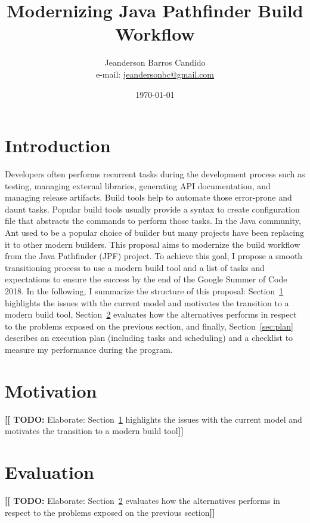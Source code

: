 \documentclass[a4paper]{article}
\author{Jeanderson Barros Candido\\e-mail: \url{jeandersonbc@gmail.com}}
\title{Modernizing Java Pathfinder Build Workflow}
\date{\today}
\newcommand{\todo}[1]{\textbf{[[ TODO: }{\color{blue} #1}\textbf{]]}}
\newcommand{\ant}{Ant}
\begin{document}
\maketitle

\section*{Introduction}

Developers often performs recurrent tasks during the development process such
as testing, managing external libraries, generating API documentation, and
managing release artifacts.
Build tools help to automate those error-prone and daunt tasks.
Popular build tools usually provide a syntax to create configuration file
that abstracts the commands to perform those tasks.
In the Java community, \ant{} used to be a popular choice of builder but many
projects have been replacing it to other modern builders.
This proposal aims to modernize the build workflow from the Java Pathfinder
(JPF) project.
To achieve this goal, I propose a smooth transitioning process to use a modern
build tool and a list of tasks and expectations to ensure the success by the
end of the Google Summer of Code 2018.
In the following, I summarize the structure of this proposal:
Section~\ref{sec:motivation} highlights the issues with the current model and
motivates the transition to a modern build tool, Section~\ref{sec:evaluation}
evaluates how the alternatives performs in respect to the problems exposed on
the previous section, and finally, Section~\ref{sec:plan} describes an
execution plan (including tasks and scheduling) and a checklist to measure my
performance during the program.

\section{Motivation}
\label{sec:motivation}

\todo{Elaborate: Section~\ref{sec:motivation} highlights the issues with the
current model and motivates the transition to a modern build tool}

\section{Evaluation}
\label{sec:evaluation}

\todo{Elaborate: Section~\ref{sec:evaluation} evaluates how the alternatives
performs in respect to the problems exposed on the previous section}
\end{document}
